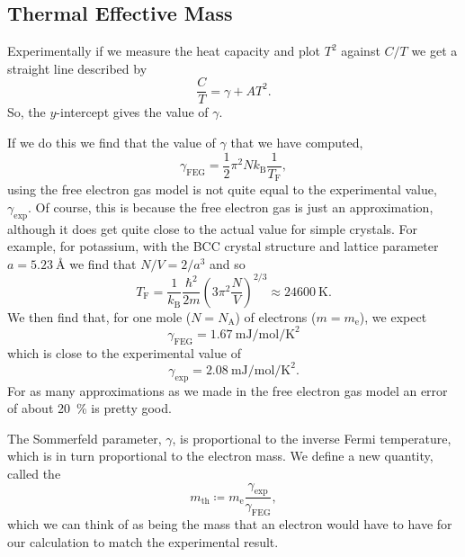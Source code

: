 \documentclass[fleqn]{NotesClass}
\newcommand*{\boltzmann}{k_{\mathrm{B}}}
\newcommand*{\avogadro}{N_{\mathrm{A}}}
\newcommand*{\fermi}{\mathrm{F}}
\begin{document}
    \subsection{Thermal Effective Mass}
    Experimentally if we measure the heat capacity and plot \(T^2\) against \(C/T\) we get a straight line described by
    \begin{equation}
        \frac{C}{T} = \gamma + AT^2.
    \end{equation}
    So, the \(y\)-intercept gives the value of \(\gamma\).
    
    If we do this we find that the value of \(\gamma\) that we have computed,
    \begin{equation}
        \gamma_{\mathrm{FEG}} = \frac{1}{2}\pi^2N\boltzmann\frac{1}{T_{\fermi}},
    \end{equation}
    using the free electron gas model is not quite equal to the experimental value, \(\gamma_{\mathrm{exp}}\).
    Of course, this is because the free electron gas is just an approximation, although it does get quite close to the actual value for simple crystals.
    For example, for potassium, with the BCC crystal structure and lattice parameter \(a = \qty{5.23}{\angstrom}\) we find that \(N/V = 2/a^3\) and so
    \begin{equation}
        T_{\fermi} = \frac{1}{\boltzmann} \frac{\hbar^2}{2m} \left( 3\pi^2\frac{N}{V} \right)^{2/3} \approx \qty{24600}{\kelvin}.
    \end{equation}
    We then find that, for one mole (\(N = \avogadro\)) of electrons (\(m = m_{\mathrm{e}}\)), we expect
    \begin{equation}
        \gamma_{\mathrm{FEG}} = \qty{1.67}{\milli\joule\per\mole\per\kelvin\squared}
    \end{equation}
    which is close to the experimental value of
    \begin{equation}
        \gamma_{\mathrm{exp}} = \qty{2.08}{\milli\joule\per\mole\per\kelvin\squared}.
    \end{equation}
    For as many approximations as we made in the free electron gas model an error of about \qty{20}{\percent} is pretty good.
    
    The Sommerfeld parameter, \(\gamma\), is proportional to the inverse Fermi temperature, which is in turn proportional to the electron mass.
    We define a new quantity, called the 
    \begin{equation}
        m_{\mathrm{th}} \coloneqq m_{\mathrm{e}} \frac{\gamma_{\mathrm{exp}}}{\gamma_{\mathrm{FEG}}},
    \end{equation}
    which we can think of as being the mass that an electron would have to have for our calculation to match the experimental result.
    
\end{document}

